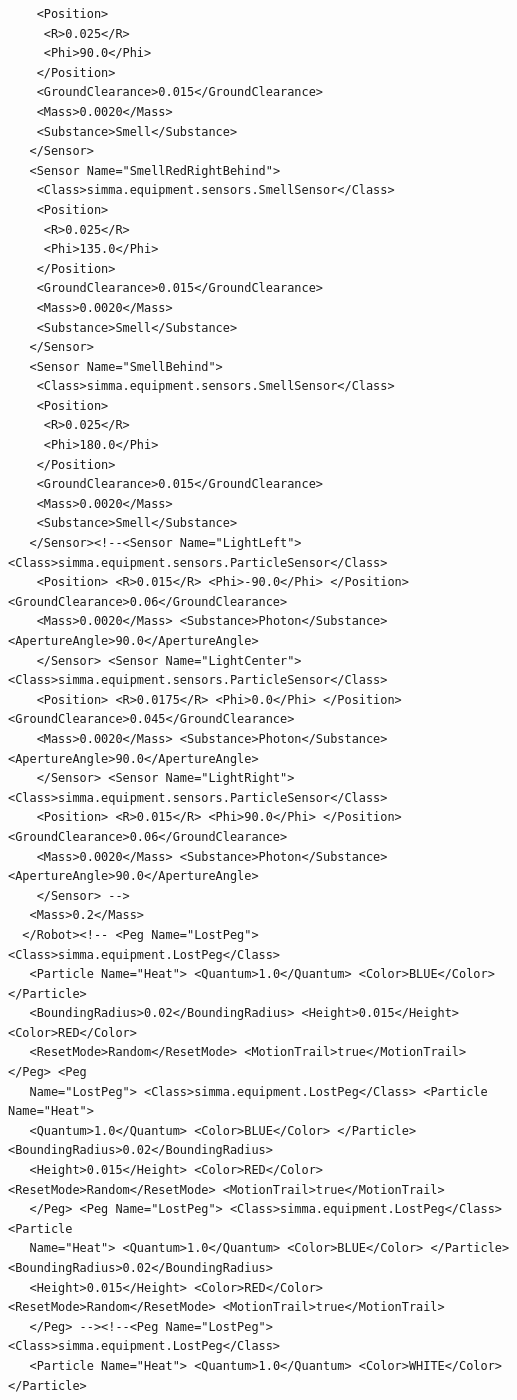 \documentclass[12pt,fleqn,a4paper]{article}
\begin{document}
\begin{lstlisting}
    <Position>
     <R>0.025</R>
     <Phi>90.0</Phi>
    </Position>
    <GroundClearance>0.015</GroundClearance>
    <Mass>0.0020</Mass>
    <Substance>Smell</Substance>
   </Sensor>
   <Sensor Name="SmellRedRightBehind">
    <Class>simma.equipment.sensors.SmellSensor</Class>
    <Position>
     <R>0.025</R>
     <Phi>135.0</Phi>
    </Position>
    <GroundClearance>0.015</GroundClearance>
    <Mass>0.0020</Mass>
    <Substance>Smell</Substance>
   </Sensor>
   <Sensor Name="SmellBehind">
    <Class>simma.equipment.sensors.SmellSensor</Class>
    <Position>
     <R>0.025</R>
     <Phi>180.0</Phi>
    </Position>
    <GroundClearance>0.015</GroundClearance>
    <Mass>0.0020</Mass>
    <Substance>Smell</Substance>
   </Sensor><!--<Sensor Name="LightLeft"> <Class>simma.equipment.sensors.ParticleSensor</Class>
    <Position> <R>0.015</R> <Phi>-90.0</Phi> </Position> <GroundClearance>0.06</GroundClearance>
    <Mass>0.0020</Mass> <Substance>Photon</Substance> <ApertureAngle>90.0</ApertureAngle>
    </Sensor> <Sensor Name="LightCenter"> <Class>simma.equipment.sensors.ParticleSensor</Class>
    <Position> <R>0.0175</R> <Phi>0.0</Phi> </Position> <GroundClearance>0.045</GroundClearance>
    <Mass>0.0020</Mass> <Substance>Photon</Substance> <ApertureAngle>90.0</ApertureAngle>
    </Sensor> <Sensor Name="LightRight"> <Class>simma.equipment.sensors.ParticleSensor</Class>
    <Position> <R>0.015</R> <Phi>90.0</Phi> </Position> <GroundClearance>0.06</GroundClearance>
    <Mass>0.0020</Mass> <Substance>Photon</Substance> <ApertureAngle>90.0</ApertureAngle>
    </Sensor> -->
   <Mass>0.2</Mass>
  </Robot><!-- <Peg Name="LostPeg"> <Class>simma.equipment.LostPeg</Class>
   <Particle Name="Heat"> <Quantum>1.0</Quantum> <Color>BLUE</Color> </Particle>
   <BoundingRadius>0.02</BoundingRadius> <Height>0.015</Height> <Color>RED</Color>
   <ResetMode>Random</ResetMode> <MotionTrail>true</MotionTrail> </Peg> <Peg
   Name="LostPeg"> <Class>simma.equipment.LostPeg</Class> <Particle Name="Heat">
   <Quantum>1.0</Quantum> <Color>BLUE</Color> </Particle> <BoundingRadius>0.02</BoundingRadius>
   <Height>0.015</Height> <Color>RED</Color> <ResetMode>Random</ResetMode> <MotionTrail>true</MotionTrail>
   </Peg> <Peg Name="LostPeg"> <Class>simma.equipment.LostPeg</Class> <Particle
   Name="Heat"> <Quantum>1.0</Quantum> <Color>BLUE</Color> </Particle> <BoundingRadius>0.02</BoundingRadius>
   <Height>0.015</Height> <Color>RED</Color> <ResetMode>Random</ResetMode> <MotionTrail>true</MotionTrail>
   </Peg> --><!--<Peg Name="LostPeg"> <Class>simma.equipment.LostPeg</Class>
   <Particle Name="Heat"> <Quantum>1.0</Quantum> <Color>WHITE</Color> </Particle>

\end{lstlisting}
\end{document}
